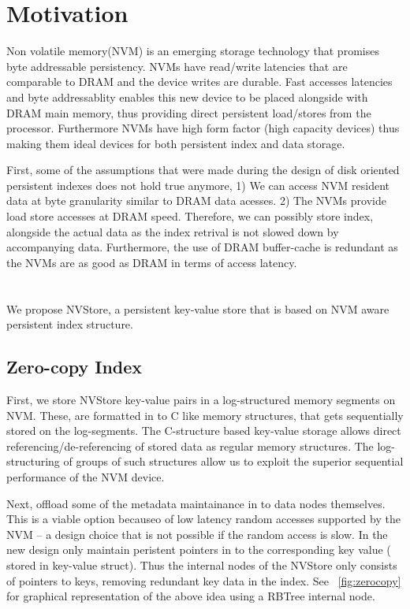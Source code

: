 \section{Motivation}
Non volatile memory(NVM) is an emerging storage technology that promises byte addressable 
persistency. NVMs have read/write latencies that are comparable to DRAM and the device 
writes are durable. Fast accesses latencies and byte addressablity enables this new device
to be placed alongside with DRAM main memory, thus providing direct persistent load/stores
from the processor. Furthermore NVMs have high form factor (high capacity devices) thus
making them ideal devices for both persistent index and data storage. 


First, some of the assumptions that were made during the design of disk oriented persistent
indexes does not hold true anymore, 1) We can access NVM resident data at byte granularity similar to
DRAM data acesses. 2) The NVMs provide load store accesses at DRAM speed. Therefore, we can
possibly store index, alongside the actual data as the index retrival is not slowed down by
accompanying data. Furthermore, the use of DRAM buffer-cache is redundant as the NVMs are 
as good as DRAM in terms of access latency.


\section{}

We propose NVStore, a persistent key-value store that is based on NVM aware persistent index
structure. 

\subsection{Zero-copy Index}

First, we store NVStore key-value pairs in a log-structured memory segments on NVM. These, are 
formatted in to C like memory structures, that gets sequentially stored on the log-segments. The
C-structure based key-value storage allows direct referencing/de-referencing of stored data 
as regular memory structures. The log-structuring of groups of such structures allow us to 
exploit the superior sequential performance of the NVM device.

Next, offload some of the metadata maintainance in to data nodes themselves. This is a viable
option becauseo of low latency random accesses supported by the NVM -- a design choice that
is not possible if the random access is slow. In the new design only maintain peristent pointers
in to the corresponding key value ( stored in key-value struct). Thus the internal nodes of the 
NVStore only consists of pointers to keys, removing redundant key data in the index. 
See ~\autoref{fig:zerocopy} for graphical representation of the above idea using a RBTree internal
node.

